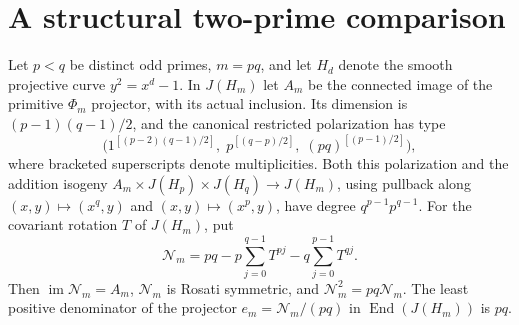 \section{A structural two-prime comparison}
\begin{proposition}
\label{pp:prop:twoprimefermat}
Let $p<q$ be distinct odd primes, $m=pq$, and let $H_d$ denote
the smooth projective curve $y^2=x^d-1$. In $J(H_m)$ let $A_m$ be
the connected image of the primitive $\Phi_m$ projector, with its
actual inclusion. Its dimension is $(p-1)(q-1)/2$, and the canonical
restricted polarization has type
\[
 \bigl(1^{[(p-2)(q-1)/2]},\;
       p^{[(q-p)/2]},\;(pq)^{[(p-1)/2]}\bigr),
\]
where bracketed superscripts denote multiplicities.
Both this polarization and the addition isogeny
$A_m\times J(H_p)\times J(H_q)\to J(H_m)$, using pullback along
$(x,y)\mapsto(x^q,y)$ and $(x,y)\mapsto(x^p,y)$, have degree
$q^{p-1}p^{q-1}$.
For the covariant rotation $T$ of $J(H_m)$, put
\[
 \mathcal N_m=pq-p\sum_{j=0}^{q-1}T^{pj}
                  -q\sum_{j=0}^{p-1}T^{qj}.
\]
Then $\operatorname{im}\mathcal N_m=A_m$, $\mathcal N_m$ is
Rosati symmetric, and $\mathcal N_m^2=pq\mathcal N_m$.
The least positive denominator of the projector
$e_m=\mathcal N_m/(pq)$ in $\operatorname{End}(J(H_m))$ is $pq$.
\end{proposition}
